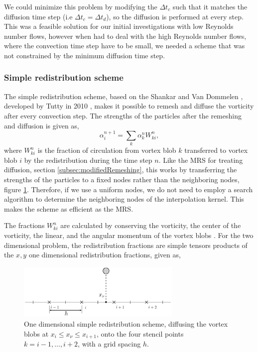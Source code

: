 We could minimize this problem by modifying the $\Delta t_c$ such that it matches the diffusion time step (i.e $\Delta t_c = \Delta t_d$), so the diffusion is performed at every step. This was a feasible solution for our initial investigations with low Reynolds number flows, however when had to deal with the high Reynolds number flows, where the convection time step have to be small, we needed a scheme that was not constrained by the minimum diffusion time step.

\subsubsection*{Simple redistribution scheme}
\label{subsubsec:srs}
The simple redistribution scheme, based on the Shankar and Van Dommelen \cite{Shankar1996}, developed by Tutty in 2010 \cite{Tutty2010a}, makes it possible to remesh and diffuse the vorticity after every convection step. The strengths of the particles after the remeshing and diffusion is given as, 
	\begin{equation}
	\alpha_i^{n+1} = \sum_k \alpha_k^n W_{ki}^n, 
	\end{equation}
where $W_{ki}^n$ is the fraction of circulation from vortex blob $k$ transferred to vortex blob $i$ by the redistribution during the time step $n$. Like the MRS for treating diffusion, section \ref{subsec:modifiedRemeshing}, this  works by transferring the strengths of the particles to a fixed nodes rather than the neighboring nodes, figure \ref{fig:simpleRedistribution}. Therefore, if we use a uniform nodes, we do not need to employ a search algorithm to determine the neighboring nodes of the interpolation kernel. This makes the scheme as efficient as the MRS.

The fractions $W_{ki}^n$ are calculated by conserving the vorticity, the center of the vorticity, the linear, and the angular momentum of the vortex blobs \cite{Tutty2010a}. For the two dimensional problem, the redistribution fractions are simple tensors products of the $x,y$ one dimensional redistribution fractions, given as,

	\begin{figure}[t]
	\centering
	\includegraphics[width=0.7\textwidth]{figures/lagrangian/simpleRedistribution.pdf}
	\caption{One dimensional simple redistribution scheme, diffusing the vortex blobs at $x_i \le x_{\nu} \le x_{i+1}$, onto the four stencil points $k=i-1,\dots,i+2$, with a grid spacing $h$.}
	\label{fig:simpleRedistribution}
	\end{figure}

